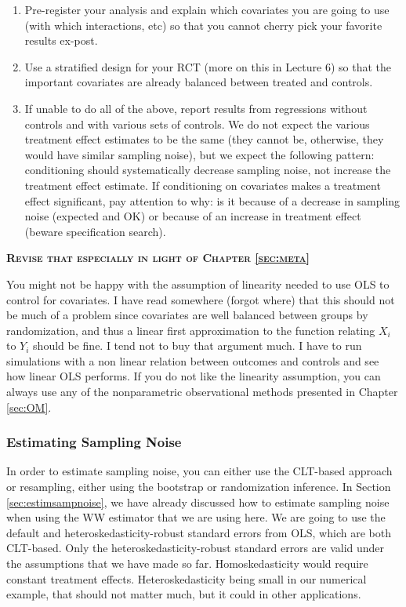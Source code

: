 \documentclass[]{book}
\providecommand{\tightlist}{%
  \setlength{\itemsep}{0pt}\setlength{\parskip}{0pt}}
\theoremstyle{definition}
\theoremstyle{definition}
\theoremstyle{definition}
\theoremstyle{remark}
\let\BeginKnitrBlock\begin \let\EndKnitrBlock\end
\begin{document}
\begin{enumerate}
\def\labelenumi{\arabic{enumi}.}
\tightlist
\item
  Pre-register your analysis and explain which covariates you are going to use (with which interactions, etc) so that you cannot cherry pick your favorite results ex-post.
\item
  Use a stratified design for your RCT (more on this in Lecture 6) so that the important covariates are already balanced between treated and controls.
\item
  If unable to do all of the above, report results from regressions without controls and with various sets of controls.
  We do not expect the various treatment effect estimates to be the same (they cannot be, otherwise, they would have similar sampling noise), but we expect the following pattern: conditioning should systematically decrease sampling noise, not increase the treatment effect estimate.
  If conditioning on covariates makes a treatment effect significant, pay attention to why: is it because of a decrease in sampling noise (expected and OK) or because of an increase in treatment effect (beware specification search).
\end{enumerate}

\textbf{\textsc{Revise that especially in light of Chapter \ref{sec:meta}}}

\BeginKnitrBlock{remark}
\iffalse{} {Remark. } \fi{}You might not be happy with the assumption of linearity needed to use OLS to control for covariates.
I have read somewhere (forgot where) that this should not be much of a problem since covariates are well balanced between groups by randomization, and thus a linear first approximation to the function relating \(X_i\) to \(Y_i\) should be fine.
I tend not to buy that argument much.
I have to run simulations with a non linear relation between outcomes and controls and see how linear OLS performs.
If you do not like the linearity assumption, you can always use any of the nonparametric observational methods presented in Chapter \ref{sec:OM}.
\EndKnitrBlock{remark}

\hypertarget{estimating-sampling-noise}{%
\subsubsection{Estimating Sampling Noise}\label{estimating-sampling-noise}}

In order to estimate sampling noise, you can either use the CLT-based approach or resampling, either using the bootstrap or randomization inference.
In Section \ref{sec:estimsampnoise}, we have already discussed how to estimate sampling noise when using the WW estimator that we are using here.
We are going to use the default and heteroskedasticity-robust standard errors from OLS, which are both CLT-based.
Only the heteroskedasticity-robust standard errors are valid under the assumptions that we have made so far.
Homoskedasticity would require constant treatment effects.
Heteroskedasticity being small in our numerical example, that should not matter much, but it could in other applications.
\end{document}
